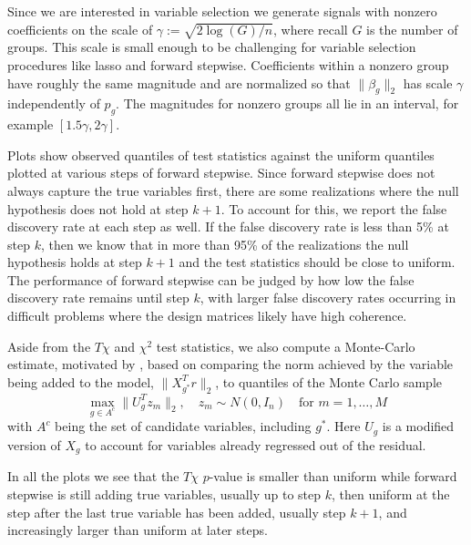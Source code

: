 \documentclass[oupdraft]{bio}
\begin{document}
Since we are interested in variable selection we generate signals with
nonzero coefficients on the scale of $\gamma := \sqrt{2 \log(G)/n}$,
where recall $G$ is the number of groups. This scale is small enough to
be challenging for variable selection procedures like lasso and forward
stepwise. Coefficients within a
nonzero group have roughly the same magnitude and are normalized
so that $\| \beta_g \|_2$ has scale $\gamma$ independently of $p_g$.
The magnitudes for nonzero groups all lie in an interval, for
example $[1.5\gamma, 2\gamma]$.



Plots show observed quantiles of test statistics against the uniform quantiles plotted at various steps of forward stepwise. Since forward stepwise does not always capture the true variables first, there are some realizations where the null hypothesis does not hold at step $k+1$. To account for this, we report the false discovery rate at each step as well. If the false discovery rate is less than 5\% at step $k$, then we know that in more than 95\% of the realizations the null hypothesis holds at step $k+1$ and the test statistics should be close to uniform. The performance of forward stepwise can be judged by how low the false discovery rate remains until step $k$, with larger false discovery rates occurring in difficult problems where the design matrices likely have high coherence.

Aside from the $T\chi$ and $\chi^2$ test statistics, we also compute a Monte-Carlo estimate, motivated by \cite{buja_discussion}, based on comparing the norm achieved by the variable being added to the model, $\| X_{g^*}^T r \|_2$, to quantiles of the Monte Carlo sample
\[
\max_{g \in A^c} \| U_g^T z_m \|_2, \quad z_m \sim N(0, I_n) \quad \text{for } m = 1,\ldots,M
\]
with $A^c$ being the set of candidate variables, including $g^*$. Here $U_g$ is a modified version of $X_g$ to account for variables already regressed out of the residual. 

\begin{remark}
In all the plots we see that the $T\chi$ $p$-value is smaller than uniform while forward stepwise is still adding true variables, usually up to step $k$, then uniform at the step after the last true variable has been added, usually step $k+1$, and increasingly larger than uniform at later steps.
\end{remark}
\end{document}
